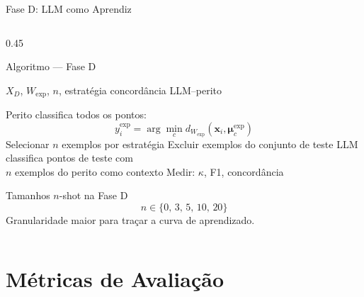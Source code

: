 \documentclass[aspectratio=169, 8pt]{beamer}
\begin{document}
\begin{frame}{Fase D: LLM como Aprendiz}
\begin{columns}[T]
    \begin{column}{0.45\textwidth}
      \begin{block}{Algoritmo --- Fase D}
        \begin{algorithmic}[1]
          \scriptsize
          \Require $X_D$, $W_{\text{exp}}$, $n$, estratégia
          \Ensure concordância LLM--perito

          \State Perito classifica todos os pontos:
          \[
            y_i^{\text{exp}} = \arg\min_c d_{W_{\text{exp}}}(\mathbf{x}_i, \boldsymbol{\mu}_c^{\text{exp}})
          \]
            \State Selecionar $n$ exemplos por estratégia
            \State Excluir exemplos do conjunto de teste
          \EndIf
          \State LLM classifica pontos de teste com\\
          \quad $n$ exemplos do perito como contexto
          \State Medir: $\kappa$, F1, concordância
        \end{algorithmic}
      \end{block}

      \vspace{0.1em}
      \begin{block}{Tamanhos $n$-shot na Fase D}
        \[
          n \in \{0,\, 3,\, 5,\, 10,\, 20\}
        \]
        Granularidade maior para traçar a curva de aprendizado.
      \end{block}

    \end{column}
  \end{columns}
\end{frame}

\section{Métricas de Avaliação}
\end{document}
